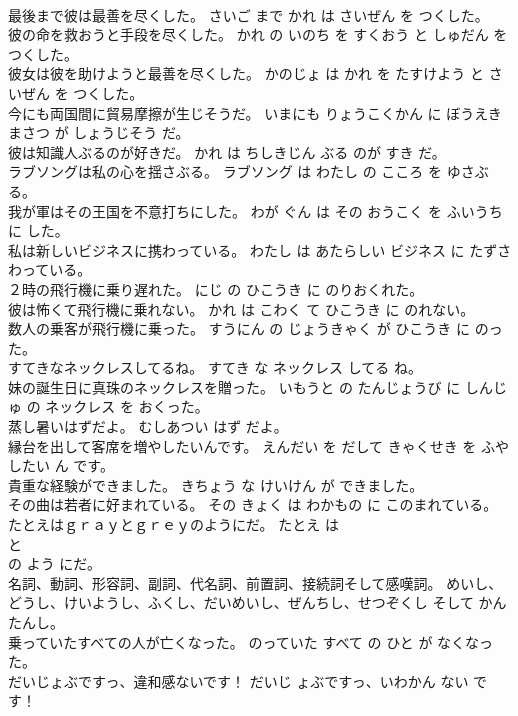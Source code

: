\documentclass[8pt]{extreport}
\begin{document}
\begin{CJK}{UTF8}{min}
\\	最後まで彼は最善を尽くした。	さいご まで かれ は さいぜん を つくした。	
\\	彼の命を救おうと手段を尽くした。	かれ の いのち を すくおう と しゅだん を つくした。	
\\	彼女は彼を助けようと最善を尽くした。	かのじょ は かれ を たすけよう と さいぜん を つくした。	
\\	今にも両国間に貿易摩擦が生じそうだ。	いまにも りょうこくかん に ぼうえき まさつ が しょうじそう だ。	
\\	彼は知識人ぶるのが好きだ。	かれ は ちしきじん ぶる のが すき だ。	
\\	ラブソングは私の心を揺さぶる。	ラブソング は わたし の こころ を ゆさぶる。	
\\	我が軍はその王国を不意打ちにした。	わが ぐん は その おうこく を ふいうち に した。	
\\	私は新しいビジネスに携わっている。	わたし は あたらしい ビジネス に たずさわっている。	
\\	２時の飛行機に乗り遅れた。	にじ の ひこうき に のりおくれた。	
\\	彼は怖くて飛行機に乗れない。	かれ は こわく て ひこうき に のれない。	
\\	数人の乗客が飛行機に乗った。	すうにん の じょうきゃく が ひこうき に のった。	
\\	すてきなネックレスしてるね。	すてき な ネックレス してる ね。	
\\	妹の誕生日に真珠のネックレスを贈った。	いもうと の たんじょうび に しんじゅ の ネックレス を おくった。	
\\	蒸し暑いはずだよ。	むしあつい はず だよ。	
\\	縁台を出して客席を増やしたいんです。	えんだい を だして きゃくせき を ふやしたい ん です。	
\\	貴重な経験ができました。	きちょう な けいけん が できました。	
\\	その曲は若者に好まれている。	その きょく は わかもの に このまれている。	
\\	たとえはｇｒａｙとｇｒｅｙのようにだ。	たとえ は 
\\	と 
\\	の よう にだ。	
\\	名詞、動詞、形容詞、副詞、代名詞、前置詞、接続詞そして感嘆詞。	めいし、どうし、けいようし、ふくし、だいめいし、ぜんちし、せつぞくし そして かんたんし。	
\\	乗っていたすべての人が亡くなった。	のっていた すべて の ひと が なくなった。	
\\	だいじょぶですっ、違和感ないです！	だいじ ょぶですっ、いわかん ない です！	

\end{CJK}
\end{document}

